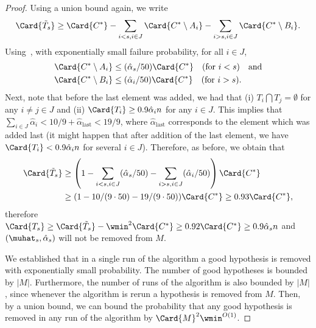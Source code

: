 \begin{proof}
Using a union bound again, we write
\begin{equation*}
    \Card{\tilde T_s} \geq 
    \Card{C^{\ast}} 
    - \sum_{i < s, i \in J} \Card{C^{\ast} \setminus A_i} 
    - \sum_{i > s, i \in J} \Card{C^{\ast} \setminus B_i}.
\end{equation*}
Using~, with exponentially small failure probability, for all \(i \in J\),
\begin{equation*}
    \begin{aligned}
    \Card{C^{\ast} \setminus A_i} &\leq (\hat\alpha_s / 50) \Card{C^{\ast}} \quad \text{(for } i < s \text{)} \quad \text{and} \\
    \Card{C^{\ast} \setminus B_i} &\leq (\hat\alpha_i / 50) \Card{C^{\ast}} \quad \text{(for } i > s \text{)}.
    \end{aligned}
\end{equation*}
Next, note that before the last element was added, we had that 
(i) \(T_i \bigcap T_j = \emptyset\) for any \(i \neq j \in J\) and 
(ii) \(\Card{T_i} \geq 0.9\hat\alpha_i n\) for any \(i \in J\).
This implies that \(\sum_{i \in J} \hat\alpha_i < 10/9 + \hat\alpha_{\text{last}} < 19/9\), 
where \(\hat\alpha_{\text{last}}\) corresponds to the element which was added last 
(it might happen that after addition of the last element, we have \(\Card{T_i} < 0.9\hat\alpha_i n\) for several \(i \in J\)). 
Therefore, as before, we obtain that 
\begin{equation*}
    \begin{aligned}
    \Card{\tilde T_s} &\geq \left(1 - \sum_{i < s, i \in J} (\hat\alpha_s / 50) - \sum_{i > s, i \in J} (\hat\alpha_i / 50)\right) \Card{C^{\ast}} \\
    &\geq  (1 - 10/(9 \cdot 50) - 19 / (9 \cdot 50)) \Card{C^{\ast}} \geq 0.93 \Card{C^{\ast}},
    \end{aligned}
\end{equation*}
therefore 
\(\Card{T_s} \geq \Card{\tilde T_s} - \wmin^2 \Card{C^{\ast}} \geq 0.92 \Card{C^{\ast}} \geq 0.9\hat\alpha_s n\) and \((\muhat_s, \hat\alpha_s)\) will not be removed from \(M\).

We established that in a single run of the algorithm a good hypothesis is removed with exponentially small probability.
The number of good hypotheses is bounded by $|M|$.
Furthermore, the number of runs of the algorithm is also bounded by $|M|$, since whenever the algorithm is rerun a hypothesis is removed from $M$.
Then, by a union bound, we can bound the probability that any good hypothesis is removed in any run of the algorithm by $\Card{M}^2 \wmin^{O(1)}$.
\end{proof}